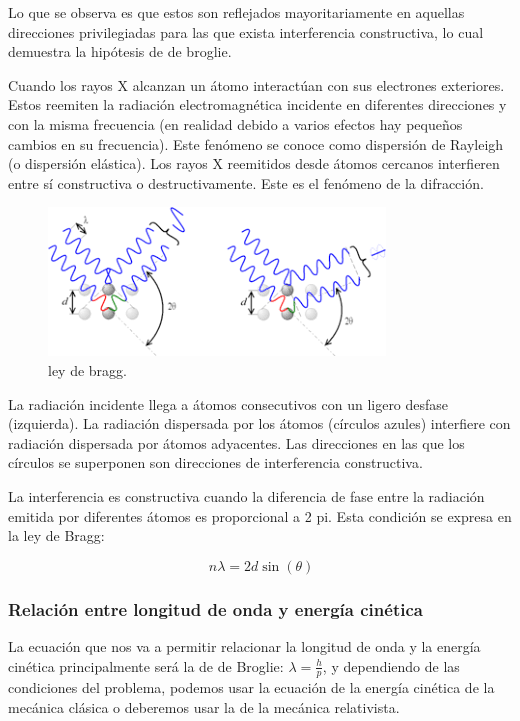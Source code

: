 \documentclass[]{article}
\begin{document}
Lo que se observa es que estos son reflejados mayoritariamente en
aquellas direcciones privilegiadas para las que exista interferencia
constructiva, lo cual demuestra la hipótesis de de broglie.

Cuando los rayos X alcanzan un átomo interactúan con sus electrones
exteriores. Estos reemiten la radiación electromagnética incidente en
diferentes direcciones y con la misma frecuencia (en realidad debido a
varios efectos hay pequeños cambios en su frecuencia). Este fenómeno se
conoce como dispersión de Rayleigh (o dispersión elástica). Los rayos X
reemitidos desde átomos cercanos interfieren entre sí constructiva o
destructivamente. Este es el fenómeno de la difracción.

\begin{figure}[H]
\centering
\includegraphics{bragg.png}
\caption{ley de bragg.}
\end{figure}

La radiación incidente llega a átomos consecutivos con un ligero desfase
(izquierda). La radiación dispersada por los átomos (círculos azules)
interfiere con radiación dispersada por átomos adyacentes. Las
direcciones en las que los círculos se superponen son direcciones de
interferencia constructiva.

La interferencia es constructiva cuando la diferencia de fase entre la
radiación emitida por diferentes átomos es proporcional a 2 pi. Esta
condición se expresa en la ley de Bragg:

\[\ n \lambda = 2 d \sin(\theta)\]

\hypertarget{relaciuxf3n-entre-longitud-de-onda-y-energuxeda-cinuxe9tica}{%
\subsubsection{Relación entre longitud de onda y energía
cinética}\label{relaciuxf3n-entre-longitud-de-onda-y-energuxeda-cinuxe9tica}}

La ecuación que nos va a permitir relacionar la longitud de onda y la
energía cinética principalmente será la de de Broglie:
\(\lambda = \frac{h}{p}\), y dependiendo de las condiciones del
problema, podemos usar la ecuación de la energía cinética de la mecánica
clásica o deberemos usar la de la mecánica relativista.
\end{document}
